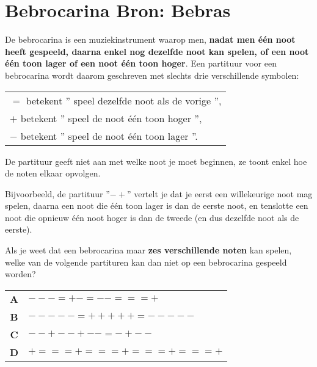 \documentclass[12pt, a4paper]{article}
\begin{document}
	\begin{minipage}{\textwidth}
		\section{Bebrocarina \hfill\small Bron: Bebras}
			
			De bebrocarina is een muziekinstrument waarop men, \textbf{nadat men \'e\'en noot heeft gespeeld, daarna enkel nog dezelfde noot kan spelen, of een noot \'e\'en toon lager of een noot \'e\'en toon hoger}. Een partituur voor een bebrocarina wordt daarom geschreven met slechts drie verschillende symbolen:
			
			\begin{table}[H]
				\setlength\parindent{24pt}
				\begin{tabular}{l}
					$=$ betekent '' speel dezelfde noot als de vorige '', \\
					$+$ betekent '' speel de noot \'e\'en toon hoger '', \\
					$-$ betekent '' speel de noot \'e\'en toon lager ''.
				\end{tabular}
			\end{table}
			
			De partituur geeft niet aan met welke noot je moet beginnen, ze toont enkel hoe de noten elkaar opvolgen.
			
			Bijvoorbeeld, de partituur ''$- +$'' vertelt je dat je eerst een willekeurige noot mag spelen, daarna een noot die \'e\'en toon lager is dan de eerste noot, en tenslotte een noot die opnieuw \'e\'en noot hoger is dan de tweede (en dus dezelfde noot als de eerste).
			
			Als je weet dat een bebrocarina maar \textbf{zes verschillende noten} kan spelen, welke van de volgende partituren kan dan niet op een bebrocarina gespeeld worden?
			
			\begin{table}[H]
				\centering
				\begin{tabular}{|c l|}
					\hline
					\textbf{A} & $- - - = + - = - - = = = +$ \\ 
					\textbf{B} & $- - - - - = + + + + + = - - - - -$ \\  
					\textbf{C} & $- - + - - + - - = - + - -$ \\ 
					\textbf{D} & $+ = = = + = = = + = = = + = = = +$ \\ 
					\hline
				\end{tabular}
			\end{table}
	\end{minipage} \\ \\
	
\end{document}
